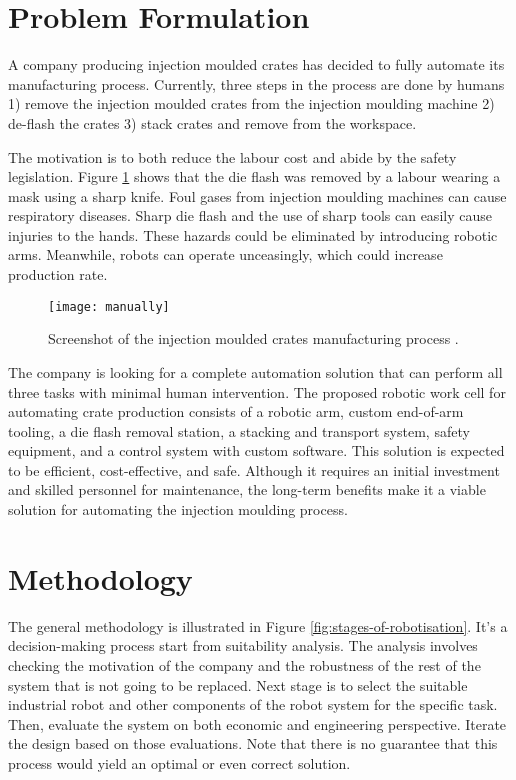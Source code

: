 \newpage
\section{Problem Formulation}

A company producing injection moulded crates has decided to fully automate its manufacturing process. Currently, three steps in the process are done by humans 1) remove the injection moulded crates from the injection moulding machine 2) de-flash the crates 3) stack crates and remove from the workspace.

The motivation is to both reduce the labour cost and abide by the safety legislation. Figure \ref{fig:manually} shows that the die flash was removed by a labour wearing a mask using a sharp knife. Foul gases from injection moulding machines can cause respiratory diseases. Sharp die flash and the use of sharp tools can easily cause injuries to the hands. These hazards could be eliminated by introducing robotic arms. Meanwhile, robots can operate unceasingly, which could increase production rate.
\begin{figure}[htbp]
   \centering
   \texttt{[image: manually]}
   \caption{Screenshot of the injection moulded crates manufacturing process \cite{ref:manually}.}
   \label{fig:manually}
\end{figure}

The company is looking for a complete automation solution that can perform all three tasks with minimal human intervention. The proposed robotic work cell for automating crate production consists of a robotic arm, custom end-of-arm tooling, a die flash removal station, a stacking and transport system, safety equipment, and a control system with custom software. This solution is expected to be efficient, cost-effective, and safe. Although it requires an initial investment and skilled personnel for maintenance, the long-term benefits make it a viable solution for automating the injection moulding process.

\section{Methodology}

The general methodology is illustrated in Figure \ref{fig:stages-of-robotisation}. It's a decision-making process start from suitability analysis. The analysis involves checking the motivation of the company and the robustness of the rest of the system that is not going to be replaced. Next stage is to select the suitable industrial robot and other components of the robot system for the specific task. Then, evaluate the system on both economic and engineering perspective. Iterate the design based on those evaluations. Note that there is no guarantee that this process would yield an optimal or even correct solution.

